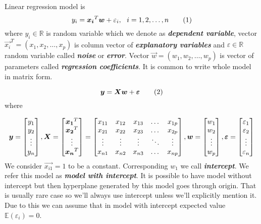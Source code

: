 \begin{definition}\label{definition:lr_model}
    Linear regression model is 
    \[ 
        y_i = \vec{x_i}^T\vec{w} + \varepsilon_i\\, \ \  i = 1,2,\ldots,n \numberthis
    \]
where $y_i \in \mathbb{R}$ is random variable which we denote as \textbf{\textit{dependent variable}}, vector $\vec{x_i}^T = (x_1, x_2, \ldots, x_p)$ is column vector of \textbf{\textit{explanatory variables}} and $\varepsilon \in \mathbb{R}$ random variable called \textbf{\textit{noise}} or \textbf{\textit{error}}. Vector $\vec{w} = (w_1, w_2, \ldots, w_p)$ is vector of parameters called  \textbf{\textit{regression coefficients}}. It is common to write whole model in matrix form. 

\[ 
    \vec{y} = \vec{X}\vec{w} + \vec{\varepsilon}    \numberthis
\] where

\[ 
\vec{y} = \begin{bmatrix}
    y_{1} \\
    y_{2} \\
    \vdots \\
    y_{n}
  \end{bmatrix}\\,
 \vec{X} = \begin{bmatrix}
    \vec{x_1}^T \\
    \vec{x_2}^T \\
    \vdots \\
    \vec{x_n}^T
\end{bmatrix}
=
\begin{bmatrix}
    x_{11} & x_{12} & x_{13} & \dots  & x_{1p} \\
    x_{21} & x_{22} & x_{23} & \dots  & x_{2p} \\
    \vdots & \vdots & \vdots & \ddots & \vdots \\
    x_{n1} & x_{n2} & x_{n3} & \dots  & x_{np}
\end{bmatrix}\\,
\vec{w} = \begin{bmatrix}
    w_{1} \\
    w_{2} \\
    \vdots \\
    w_{p}
  \end{bmatrix}\\,
  \vec{\varepsilon} = \begin{bmatrix}
    \varepsilon_{1} \\
    \varepsilon_{2} \\
    \vdots \\
    \varepsilon_{n}
  \end{bmatrix}
\]
We consider $\vec{x_{i1}} = 1$ to be a constant. Corresponding $w_{1}$ we call \textbf{\textit{intercept}}. We refer this model as \textbf{\textit{model with intercept}}. It is possible to have model without intercept but then hyperplane generated by this model goes through origin. That is usually rare case so we'll always use intercept unless we'll explicitly mention it. Due to this we can assume that in model with intercept expected value  $\mathbb{E}(\varepsilon_i) = 0$.
\end{definition}


